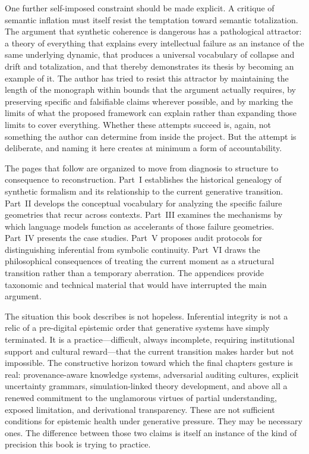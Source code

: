 \documentclass[12pt, openright, twoside]{book}
\begin{document}
One further self-imposed constraint should be made explicit. A critique of semantic
inflation must itself resist the temptation toward semantic totalization. The
argument that synthetic coherence is dangerous has a pathological attractor:
a theory of everything that explains every intellectual failure as an instance of
the same underlying dynamic, that produces a universal vocabulary of collapse and
drift and totalization, and that thereby demonstrates its thesis by becoming an
example of it. The author has tried to resist this attractor by maintaining the
length of the monograph within bounds that the argument actually requires, by
preserving specific and falsifiable claims wherever possible, and by marking the
limits of what the proposed framework can explain rather than expanding those
limits to cover everything. Whether these attempts succeed is, again, not something
the author can determine from inside the project. But the attempt is deliberate,
and naming it here creates at minimum a form of accountability.

The pages that follow are organized to move from diagnosis to structure to
consequence to reconstruction. Part~I establishes the historical genealogy of
synthetic formalism and its relationship to the current generative transition.
Part~II develops the conceptual vocabulary for analyzing the specific failure
geometries that recur across contexts. Part~III examines the mechanisms by which
language models function as accelerants of those failure geometries. Part~IV
presents the case studies. Part~V proposes audit protocols for distinguishing
inferential from symbolic continuity. Part~VI draws the philosophical consequences
of treating the current moment as a structural transition rather than a temporary
aberration. The appendices provide taxonomic and technical material that would
have interrupted the main argument.

The situation this book describes is not hopeless. Inferential integrity is not
a relic of a pre-digital epistemic order that generative systems have simply
terminated. It is a practice---difficult, always incomplete, requiring institutional
support and cultural reward---that the current transition makes harder but not
impossible. The constructive horizon toward which the final chapters gesture is
real: provenance-aware knowledge systems, adversarial auditing cultures, explicit
uncertainty grammars, simulation-linked theory development, and above all a renewed
commitment to the unglamorous virtues of partial understanding, exposed limitation,
and derivational transparency. These are not sufficient conditions for epistemic
health under generative pressure. They may be necessary ones. The difference
between those two claims is itself an instance of the kind of precision this book
is trying to practice.
\end{document}
